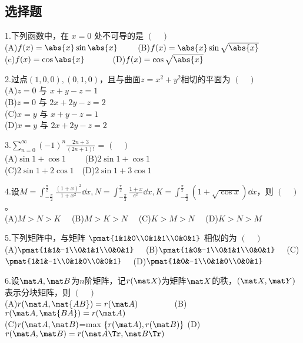 
\subsection{选择题}
1.下列函数中，在 $x=0$ 处不可导的是 $(\quad)$\\
(A)$f(x)=\abs{x} \sin \abs{x} \qquad$  (B)$f(x)=\abs{x} \sin \sqrt{\abs{x}}$\\
(c)$f(x)=\cos \abs{x} \qquad \quad$  (D)$ f(x)=\cos \sqrt{\abs{x}}$

2.过点$(1,0,0),(0,1,0)$，且与曲面$z=x^2+y^2$相切的平面为 $(\quad)$\\
(A)$z=0$ 与 $x+y-z=1$\\
(B)$z=0$ 与 $2x+2y-z=2$\\
(C)$x=y$ 与 $x+y-z=1$\\
(D)$x=y$ 与 $2x+2y-z=2$

3.$\displaystyle \sum_{n=0}^\infty (-1)^n \frac{2n+3}{(2n+1)!}$ = $(\quad)$ \\
(A)$\sin 1+\cos 1 \qquad$  (B)$2\sin 1+\cos 1$ \\
(C)$2\sin 1+2\cos 1  \quad$(D)$2\sin 1+3\cos 1$

4.设$\displaystyle M=\int_{-\frac{\pi}{2}}^\frac{\pi}{2}\frac{(1+x)^2}{1+x^2}\dd{x},N=\int_{-\frac{\pi}{2}}^\frac{\pi}{2}\frac{1+x}{e^x}\dd{x},K=\int_{-\frac{\pi}{2}}^\frac{\pi}{2}(1+\sqrt{\cos x})\dd{x}$，则 $(\quad)$ 。\\
(A)$M>N>K \quad$ (B)$M>K>N \quad$ (C)$K>M>N \quad$ (D)$K>N>M$

5.下列矩阵中，与矩阵 $\pmat{1&1&0\\0&1&1\\0&0&1}$ 相似的为 $(\quad)$\\
(A)$\pmat{1&1&-1\\0&1&1\\0&0&1} \quad$
(B)$\pmat{1&0&-1\\0&1&1\\0&0&1} \quad$
(C)$\pmat{1&1&-1\\0&1&0\\0&0&1} \quad$
(D)$\pmat{1&0&-1\\0&1&0\\0&0&1}$

6.设$\mat A,\mat B$为$n$阶矩阵，记$r(\mat X)$为矩阵$\mat X$的秩，$(\mat X,\mat Y)$表示分块矩阵，则 $(\quad)$ \\
(A)$r(\mat A,\mat {AB})=r(\mat A) \qquad \qquad$
(B)$r(\mat A,\mat {BA})=r(\mat A) \quad$\\
(C)$r(\mat A,\mat B)$=max $ \{r(\mat A),r(\mat B)\}$
(D)$r(\mat A,\mat B)=r(\mat A \Tr,\mat B \Tr)$

